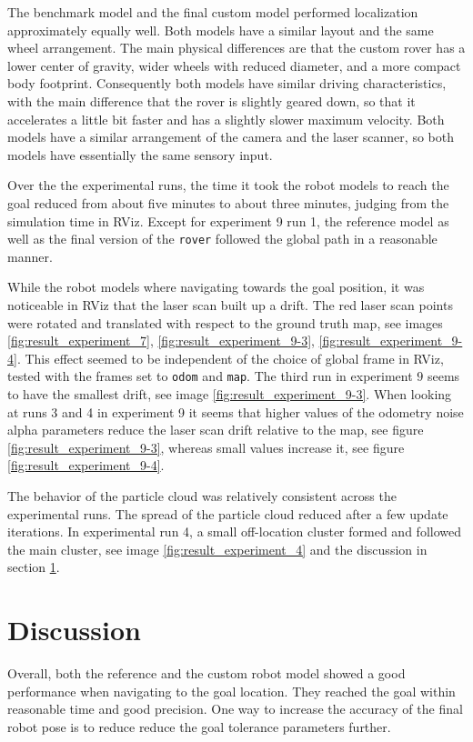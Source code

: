 \documentclass[10pt,journal,compsoc]{IEEEtran}
\begin{document}
The benchmark model and the final custom model performed localization approximately equally well. Both models have a similar layout and the same wheel arrangement. The main physical differences are that the custom rover has a lower center of gravity, wider wheels with reduced diameter, and a more compact body footprint. Consequently both models have similar driving characteristics, with the main difference that the rover is slightly geared down, so that it accelerates a little bit faster and has a slightly slower maximum velocity. Both models have a similar arrangement of the camera and the laser scanner, so both models have essentially the same sensory input. 

Over the the experimental runs, the time it took the robot models to reach the goal reduced from about five minutes to about three minutes, judging from the simulation time in RViz. Except for experiment 9 run 1, the reference model as well as the final version of the \texttt{rover} followed the global path in a reasonable manner.

While the robot models where navigating towards the goal position, it was noticeable in RViz that the laser scan built up a drift. The red laser scan points were rotated and translated with respect to the ground truth map, see images \ref{fig:result_experiment_7}, \ref{fig:result_experiment_9-3}, \ref{fig:result_experiment_9-4}. This effect seemed to be independent of the choice of global frame in RViz, tested with the frames set to \texttt{odom} and \texttt{map}. The third run in experiment $9$ seems to have the smallest drift, see image \ref{fig:result_experiment_9-3}. When looking at runs 3 and 4 in experiment 9 it seems that higher values of the odometry noise alpha parameters reduce the laser scan drift relative to the map, see figure \ref{fig:result_experiment_9-3}, whereas small values increase it, see figure \ref{fig:result_experiment_9-4}. 

The behavior of the particle cloud was relatively consistent across the experimental runs. The spread of the particle cloud reduced after a few update  iterations. In experimental run 4, a small off-location cluster formed and followed the main cluster, see image \ref{fig:result_experiment_4} and the discussion in section \ref{sec:discussion}.

\section{Discussion}
\label{sec:discussion}
Overall, both the reference and the custom robot model showed a good performance when navigating to the goal location. They reached the goal within reasonable time and good precision. One way to increase the accuracy of the final robot pose is to reduce reduce the goal tolerance parameters further.
\end{document}
